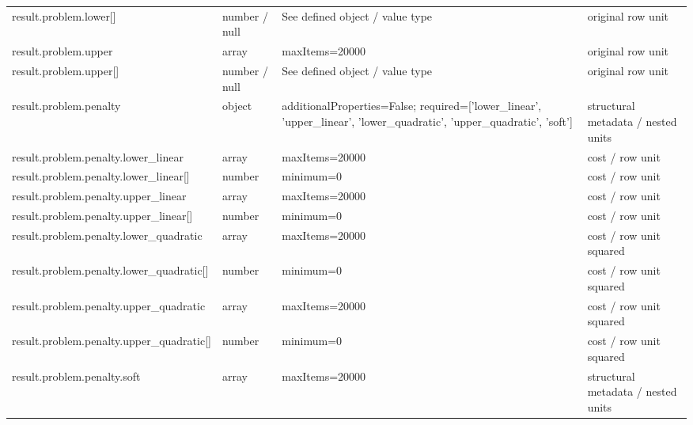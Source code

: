 \begin{longtable}{@{}>{\raggedright\arraybackslash}p{}>{\raggedright\arraybackslash}p{}>{\raggedright\arraybackslash}p{}>{\raggedright\arraybackslash}p{}@{}}
result.\allowbreak{}problem.\allowbreak{}lower[] & number /\allowbreak{} null & See defined object /\allowbreak{} value type & original row unit\\
result.\allowbreak{}problem.\allowbreak{}upper & array & maxItems=\allowbreak{}20000 & original row unit\\
result.\allowbreak{}problem.\allowbreak{}upper[] & number /\allowbreak{} null & See defined object /\allowbreak{} value type & original row unit\\
result.\allowbreak{}problem.\allowbreak{}penalty & object & additionalProperties=\allowbreak{}False; required=\allowbreak{}['lower\_\allowbreak{}linear', 'upper\_\allowbreak{}linear', 'lower\_\allowbreak{}quadratic', 'upper\_\allowbreak{}quadratic', 'soft'] & structural metadata /\allowbreak{} nested units\\
result.\allowbreak{}problem.\allowbreak{}penalty.\allowbreak{}lower\_\allowbreak{}linear & array & maxItems=\allowbreak{}20000 & cost /\allowbreak{} row unit\\
result.\allowbreak{}problem.\allowbreak{}penalty.\allowbreak{}lower\_\allowbreak{}linear[] & number & minimum=\allowbreak{}0 & cost /\allowbreak{} row unit\\
result.\allowbreak{}problem.\allowbreak{}penalty.\allowbreak{}upper\_\allowbreak{}linear & array & maxItems=\allowbreak{}20000 & cost /\allowbreak{} row unit\\
result.\allowbreak{}problem.\allowbreak{}penalty.\allowbreak{}upper\_\allowbreak{}linear[] & number & minimum=\allowbreak{}0 & cost /\allowbreak{} row unit\\
result.\allowbreak{}problem.\allowbreak{}penalty.\allowbreak{}lower\_\allowbreak{}quadratic & array & maxItems=\allowbreak{}20000 & cost /\allowbreak{} row unit squared\\
result.\allowbreak{}problem.\allowbreak{}penalty.\allowbreak{}lower\_\allowbreak{}quadratic[] & number & minimum=\allowbreak{}0 & cost /\allowbreak{} row unit squared\\
result.\allowbreak{}problem.\allowbreak{}penalty.\allowbreak{}upper\_\allowbreak{}quadratic & array & maxItems=\allowbreak{}20000 & cost /\allowbreak{} row unit squared\\
result.\allowbreak{}problem.\allowbreak{}penalty.\allowbreak{}upper\_\allowbreak{}quadratic[] & number & minimum=\allowbreak{}0 & cost /\allowbreak{} row unit squared\\
result.\allowbreak{}problem.\allowbreak{}penalty.\allowbreak{}soft & array & maxItems=\allowbreak{}20000 & structural metadata /\allowbreak{} nested units\\

\end{longtable}
